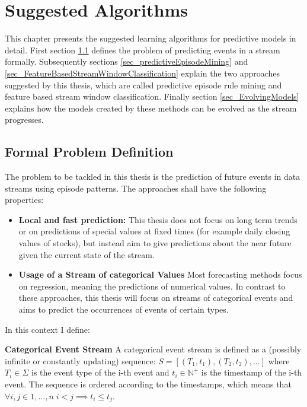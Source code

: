 \chapter{Suggested Algorithms}
\label{chapter_solutions}

\ifpdf
    \graphicspath{{Chapter4/Figs/Raster/}{Chapter4/Figs/PDF/}{Chapter4/Figs/}}
\else
    \graphicspath{{Chapter4/Figs/Vector/}{Chapter4/Figs/}}
\fi

This chapter presents the suggested learning algorithms for predictive models in detail. First section \ref{sec_formalProblemDef} defines the problem of predicting events in a stream formally. Subsequently sections \ref{sec_predictiveEpisodeMining} and \ref{sec_FeatureBasedStreamWindowClassification} explain the two approaches suggested by this thesis, which are called predictive episode rule mining and feature based stream window classification. Finally section \ref{sec_EvolvingModels} explains how the models created by these methods can be evolved as the stream progresses.

\section{Formal Problem Definition}
\label{sec_formalProblemDef}
The problem to be tackled in this thesis is the prediction of future events in data streams using episode patterns. The approaches shall have the following properties:

\begin{itemize}
	\item \textbf{Local and fast prediction:} This thesis does not focus on long term trends or on predictions of special values at fixed times (for example daily closing values of stocks), but instead aim to give predictions about the near future given the current state of the stream.
	\item \textbf{Usage of a Stream of categorical Values} Most forecasting methods focus on regression, meaning the predictions of numerical values. In contrast to these approaches, this thesis will focus on streams of categorical events and aims to predict the occurrences of events of certain types.
\end{itemize}

In this context I define:

\begin{mydef}
\textbf{Categorical Event Stream} A categorical event stream is defined as a (possibly infinite or constantly updating) sequence: $S = [ (T_1,t_1),(T_2,t_2),... ] $ where $T_i \in \Sigma$ is the event type of the i-th event and $t_i \in \mathbb{N}^+$ is the timestamp of the i-th event. The sequence is ordered according to the timestamps, which means that $\forall i,j \in {1,...,n} \; i<j \implies t_i \leq t_j$.
\end{mydef}

